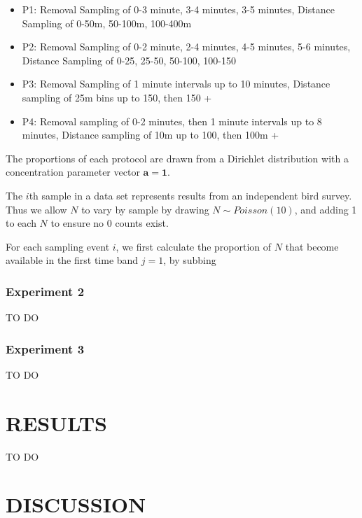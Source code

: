 \documentclass[
  11pt,
]{article}
\providecommand{\tightlist}{%
  \setlength{\itemsep}{0pt}\setlength{\parskip}{0pt}}
\begin{document}
\begin{itemize}
\tightlist
\item
  P1: Removal Sampling of 0-3 minute, 3-4 minutes, 3-5 minutes, Distance
  Sampling of 0-50m, 50-100m, 100-400m
\item
  P2: Removal Sampling of 0-2 minute, 2-4 minutes, 4-5 minutes, 5-6
  minutes, Distance Sampling of 0-25, 25-50, 50-100, 100-150
\item
  P3: Removal Sampling of 1 minute intervals up to 10 minutes, Distance
  sampling of 25m bins up to 150, then 150 +
\item
  P4: Removal sampling of 0-2 minutes, then 1 minute intervals up to 8
  minutes, Distance sampling of 10m up to 100, then 100m +
\end{itemize}

The proportions of each protocol are drawn from a Dirichlet distribution
with a concentration parameter vector \(\mathbf{a} = \mathbf{1}\).

The \(i\)th sample in a data set represents results from an independent
bird survey. Thus we allow \(N\) to vary by sample by drawing
\(N\sim Poisson(10)\), and adding 1 to each \(N\) to ensure no 0 counts
exist.

For each sampling event \(i\), we first calculate the proportion of
\(N\) that become available in the first time band \(j = 1\), by subbing

\hypertarget{experiment-2}{%
\subsubsection{Experiment 2}\label{experiment-2}}

TO DO

\hypertarget{experiment-3}{%
\subsubsection{Experiment 3}\label{experiment-3}}

TO DO

\clearpage

\hypertarget{results}{%
\section{RESULTS}\label{results}}

TO DO

\clearpage

\hypertarget{discussion}{%
\section{DISCUSSION}\label{discussion}}
\end{document}
